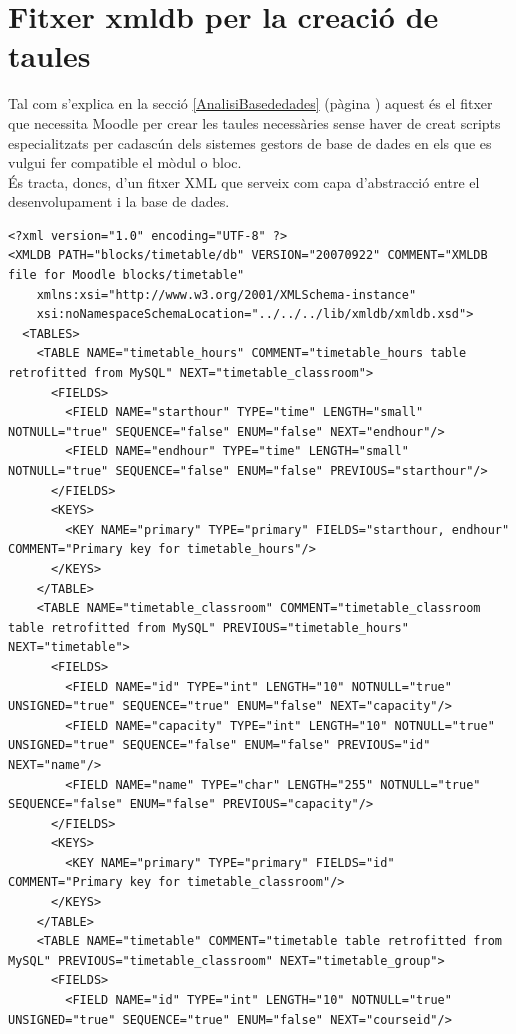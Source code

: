 \documentclass[a4paper]{report}  %
\begin{document}
\section{Fitxer xmldb per la creació de taules}\label{xmldb-1r}
Tal com s'explica en la secció \ref{AnalisiBasededades} (pàgina \pageref{AnalisiBasededades}) aquest és el fitxer que necessita Moodle per crear les taules necessàries sense haver de creat scripts especialitzats per cadascún dels sistemes gestors de base de dades en els que es vulgui fer compatible el mòdul o bloc.\\
És tracta, doncs, d'un fitxer XML que serveix com capa d'abstracció entre el desenvolupament i la base de dades.
\begin{lstlisting}[style=XML,caption=Fitxer xmldb install.xml per la creació de les taules]
<?xml version="1.0" encoding="UTF-8" ?>
<XMLDB PATH="blocks/timetable/db" VERSION="20070922" COMMENT="XMLDB file for Moodle blocks/timetable"
    xmlns:xsi="http://www.w3.org/2001/XMLSchema-instance"
    xsi:noNamespaceSchemaLocation="../../../lib/xmldb/xmldb.xsd">
  <TABLES>
    <TABLE NAME="timetable_hours" COMMENT="timetable_hours table retrofitted from MySQL" NEXT="timetable_classroom">
      <FIELDS>
        <FIELD NAME="starthour" TYPE="time" LENGTH="small" NOTNULL="true" SEQUENCE="false" ENUM="false" NEXT="endhour"/>
        <FIELD NAME="endhour" TYPE="time" LENGTH="small" NOTNULL="true" SEQUENCE="false" ENUM="false" PREVIOUS="starthour"/>
      </FIELDS>
      <KEYS>
        <KEY NAME="primary" TYPE="primary" FIELDS="starthour, endhour" COMMENT="Primary key for timetable_hours"/>
      </KEYS>
    </TABLE>
    <TABLE NAME="timetable_classroom" COMMENT="timetable_classroom table retrofitted from MySQL" PREVIOUS="timetable_hours" NEXT="timetable">
      <FIELDS>
        <FIELD NAME="id" TYPE="int" LENGTH="10" NOTNULL="true" UNSIGNED="true" SEQUENCE="true" ENUM="false" NEXT="capacity"/>
        <FIELD NAME="capacity" TYPE="int" LENGTH="10" NOTNULL="true" UNSIGNED="true" SEQUENCE="false" ENUM="false" PREVIOUS="id" NEXT="name"/>
        <FIELD NAME="name" TYPE="char" LENGTH="255" NOTNULL="true" SEQUENCE="false" ENUM="false" PREVIOUS="capacity"/>
      </FIELDS>
      <KEYS>
        <KEY NAME="primary" TYPE="primary" FIELDS="id" COMMENT="Primary key for timetable_classroom"/>
      </KEYS>
    </TABLE>
    <TABLE NAME="timetable" COMMENT="timetable table retrofitted from MySQL" PREVIOUS="timetable_classroom" NEXT="timetable_group">
      <FIELDS>
        <FIELD NAME="id" TYPE="int" LENGTH="10" NOTNULL="true" UNSIGNED="true" SEQUENCE="true" ENUM="false" NEXT="courseid"/>

\end{lstlisting}
\end{document}
